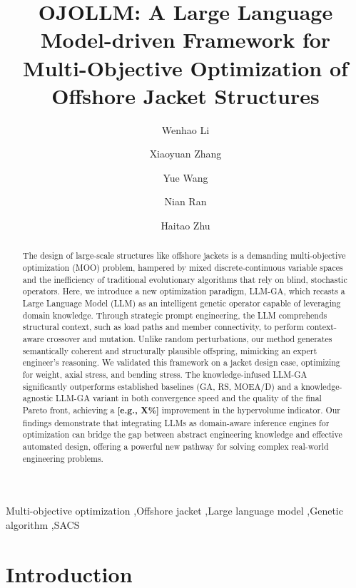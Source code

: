 \documentclass[preprint,12pt]{elsarticle}
\begin{document}
\begin{frontmatter}

\title{OJOLLM: A Large Language Model-driven Framework for Multi-Objective Optimization of Offshore Jacket Structures}

\author[aff1,aff2]{Wenhao Li}
\author[aff2]{Xiaoyuan Zhang}
\author[aff2]{Yue Wang}
\author[aff3]{Nian Ran}
\author[aff1]{Haitao Zhu}

\address[aff1]{Tianjin University}
\address[aff2]{Zhongguancun Academy}
\address[aff3]{The University of Manchester}

\begin{abstract}
    The design of large-scale structures like offshore jackets is a demanding multi-objective optimization (MOO) problem, hampered by mixed discrete-continuous variable spaces and the inefficiency of traditional evolutionary algorithms that rely on blind, stochastic operators. Here, we introduce a new optimization paradigm, LLM-GA, which recasts a Large Language Model (LLM) as an intelligent genetic operator capable of leveraging domain knowledge. Through strategic prompt engineering, the LLM comprehends structural context, such as load paths and member connectivity, to perform context-aware crossover and mutation. Unlike random perturbations, our method generates semantically coherent and structurally plausible offspring, mimicking an expert engineer's reasoning. We validated this framework on a jacket design case, optimizing for weight, axial stress, and bending stress. The knowledge-infused LLM-GA significantly outperforms established baselines (GA, RS, MOEA/D) and a knowledge-agnostic LLM-GA variant in both convergence speed and the quality of the final Pareto front, achieving a \textbf{[e.g., X\%]} improvement in the hypervolume indicator. Our findings demonstrate that integrating LLMs as domain-aware inference engines for optimization can bridge the gap between abstract engineering knowledge and effective automated design, offering a powerful new pathway for solving complex real-world engineering problems.
\end{abstract}

\begin{keyword}
Multi-objective optimization \sep Offshore jacket \sep Large language model \sep Genetic algorithm \sep SACS
\end{keyword}

\end{frontmatter}

\section{Introduction}
\end{document}
